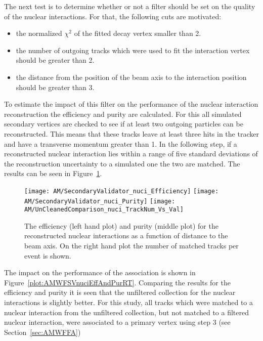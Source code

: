 The next test is to determine whether or not a filter should be set on the quality of the nuclear interactions. For that, the following cuts are motivated:
\begin{itemize}
\item the normalized $\chi^{2}$ of the fitted decay vertex smaller than 2.
\item the number of outgoing tracks which were used to fit the interaction vertex should be greater than 2.
\item the distance from the position of the beam axis to the interaction position should be greater than 3\cm.
\end{itemize}
To estimate the impact of this filter on the performance of the nuclear interaction reconstruction the efficiency and purity are calculated. For this all simulated secondary vertices are checked to see if at least two outgoing particles can be reconstructed. This means that these tracks leave at least three hits in the tracker and have a transverse momentum greater than 1\GeV. In the following step, if a reconstructed nuclear interaction lies within a range of five standard deviations of the reconstruction uncertainty to a simulated one the two are matched. The results can be seen in Figure~\ref{plot:AMWFSVnuciEffAndPurDC}. 

\begin{figure}[!ht]
  \centering
  \texttt{[image: AM/SecondaryValidator\_nuci\_Efficiency]}
  \texttt{[image: AM/SecondaryValidator\_nuci\_Purity]}
  \texttt{[image: AM/UnCleanedComparison\_nuci\_TrackNum\_Vs\_Val]}
  \caption[Purity and efficiency of the reconstructed nuclear interactions as a function of distance to the beam axis and number of matched tracks]{The efficiency (left hand plot) and purity (middle plot) for the reconstructed nuclear interactions as a function of distance to the beam axis. On the right hand plot the number of matched tracks per event is shown. \label{plot:AMWFSVnuciEffAndPurDC}}
\end{figure}

The impact on the performance of the association is shown in Figure~\ref{plot:AMWFSVnuciEffAndPurRT}. Comparing the results for the efficiency and purity it is seen that the unfiltered collection for the nuclear interactions is slightly better. For this study, all tracks which were matched to a nuclear interaction from the unfiltered collection, but not matched to a filtered nuclear interaction, were associated to a primary vertex using step 3 (see Section~\ref{sec:AMWFFA})

